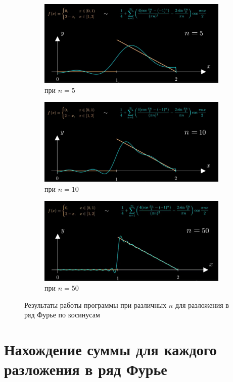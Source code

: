 \documentclass[a5paper, 10pt]{article}
\theoremstyle{definition}
\theoremstyle{plain}
\theoremstyle{remark}
\begin{document}
\begin{figure}
		\begin{center}
			\begin{subfigure}{0.7\linewidth}
				\includegraphics[width=\linewidth]{"./pictures/c_5.png"}
				\caption{при $n=5$}
			\end{subfigure}
			\begin{subfigure}{0.7\linewidth}
				\includegraphics[width=\linewidth]{"./pictures/c_10.png"}
				\caption{при $n=10$}
			\end{subfigure}
			\begin{subfigure}{0.7\linewidth}
				\includegraphics[width=\linewidth]{"./pictures/c_50.png"}
				\caption{при $n=50$}
			\end{subfigure}
		\caption{Результаты работы программы при различных $n$ для разложения в ряд Фурье по косинусам}\label{result}
		\end{center}
	\end{figure}

\newpage

\section{Нахождение суммы для каждого разложения в ряд Фурье}
\end{document}
